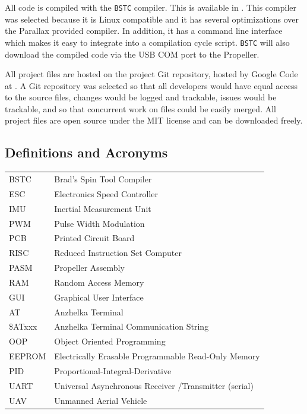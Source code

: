 \documentclass{article}
\numberwithin{equation}{section} %
\begin{document}

All code is compiled with the \texttt{BSTC} compiler. This is available in \cite{campbell09}. This compiler was selected because it is Linux compatible and it has several optimizations over the Parallax provided compiler. In addition, it has a command line interface which makes it easy to integrate into a compilation cycle script. \texttt{BSTC} will also download the compiled code via the USB COM port to the Propeller.

All project files are hosted on the project Git repository, hosted by Google Code at \cite{anzhelka_code}. A Git repository was selected so that all developers would have equal access to the source files, changes would be logged and trackable, issues would be trackable, and so that concurrent work on files  could be easily merged. All project files are open source under the MIT license and can be downloaded freely.

\subsection{Definitions and Acronyms}
\begin{tabular}{l l}
	BSTC & Brad's Spin Tool Compiler \\
	ESC & Electronics Speed Controller \\
	IMU & Inertial Measurement Unit \\
	PWM & Pulse Width Modulation \\
	PCB & Printed Circuit Board \\
	RISC & Reduced Instruction Set Computer\\
	PASM & Propeller Assembly \\
	RAM & Random Access Memory \\
	GUI & Graphical User Interface \\
	AT & Anzhelka Terminal \\
	\$ATxxx & Anzhelka Terminal Communication String \\
	OOP & Object Oriented Programming \\
	EEPROM & Electrically Erasable Programmable Read-Only Memory \\
	PID & Proportional-Integral-Derivative \\
	UART & Universal Asynchronous Receiver /Transmitter (serial) \\
	UAV & Unmanned Aerial Vehicle \\
\end{tabular}
\end{document}
